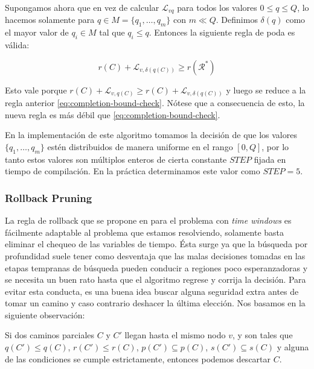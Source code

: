 Supongamos ahora que en vez de calcular $\mathscr{L}_{vq}$ para todos los valores $0 \leq q \leq Q$, lo hacemos solamente para $q \in M = \{q_1, \dots, q_m\}$ con $m \ll Q$. Definimos $\delta(q)$ como el mayor valor de $q_i \in M$ tal que $q_i \leq q$. Entonces la siguiente regla de poda es válida:  

\begin{equation}
    r(C) + \mathscr{L}_{v, \delta(q(C))} \geq r(\mathscr{R}^{*})
\end{equation}

Esto vale porque $r(C) + \mathscr{L}_{v, q(C)} \geq r(C) + \mathscr{L}_{v, \delta(q(C))}$ y luego se reduce a la regla anterior \ref{eq:completion-bound-check}. Nótese que a consecuencia de esto, la nueva regla es más débil que \ref{eq:completion-bound-check}.

En la implementación de este algoritmo tomamos la decisión de que los valores $\{q_1, \dots, q_m\}$ estén distribuidos de manera uniforme en el rango $[0, Q]$, por lo tanto estos valores son múltiplos enteros de cierta constante $STEP$ fijada en tiempo de compilación. En la práctica determinamos este valor como $STEP = 5$. 


\subsubsection{Rollback Pruning}

La regla de rollback que se propone en \cite{lozano-duque-medaglia} para el problema con \emph{time windows} es fácilmente adaptable al problema que estamos resolviendo, solamente basta eliminar el chequeo de las variables de tiempo. Ésta surge ya que la búsqueda por profundidad suele tener como desventaja que las malas decisiones tomadas en las etapas tempranas de búsqueda pueden conducir a regiones poco esperanzadoras y se necesita un buen rato hasta que el algoritmo regrese y corrija la decisión. Para evitar esta conducta, es una buena idea buscar alguna seguridad extra antes de tomar un camino y caso contrario deshacer la última elección. Nos basamos en la siguiente observación:

\begin{observation}
    Si dos caminos parciales $C$ y $C'$ llegan hasta el mismo nodo $v$, y son tales que $q(C') \leq q(C)$, $r(C') \leq r(C)$, $p(C') \subseteq p(C)$, $s(C') \subseteq s(C)$ y alguna de las condiciones se cumple estrictamente, entonces podemos descartar $C$.
\end{observation}


